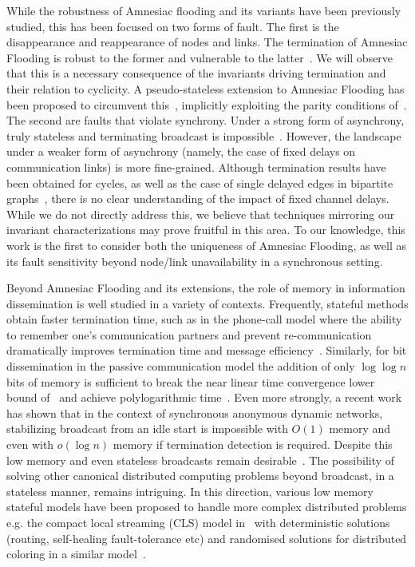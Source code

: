 While the robustness of Amnesiac flooding and its variants have been previously studied, this has been focused on two forms of fault. The first is the disappearance and reappearance of nodes and links. The termination of Amnesiac Flooding is robust to the former and vulnerable to the latter~\cite{hussak2023termination}. We will observe that  this is a necessary consequence of the invariants driving termination and their relation to cyclicity. A pseudo-stateless extension to Amnesiac Flooding has been proposed to circumvent this~\cite{turau2021synchronous}, implicitly exploiting the parity conditions of~\cite{hussak2023termination}. The second are faults that violate synchrony. Under a strong form of asynchrony, truly stateless and terminating broadcast is impossible~\cite{turau2020stateless}. However, the landscape under a weaker form of asynchrony (namely, the case of fixed delays on communication links) is more fine-grained. Although termination results have been obtained for cycles, as well as the case of single delayed edges in bipartite graphs~\cite{hussak2023termination}, there is no clear understanding of the impact of fixed channel delays. While we do not directly address this, we believe that techniques mirroring our invariant characterizations may prove fruitful in this area. To our knowledge, this work is the first to consider both the uniqueness of Amnesiac Flooding, as well as its fault sensitivity beyond node/link unavailability in a synchronous setting.

Beyond Amnesiac Flooding and its extensions, the role of memory in information dissemination is well studied in a variety of contexts. Frequently, stateful methods obtain faster termination time, such as in the phone-call model where the ability to remember one's communication partners and prevent re-communication dramatically improves termination time and message efficiency~\cite{RandomisedBroadcastFirst,RandomisedBroadcastFinal,SocialNetworksSpreadRumors}. 
Similarly, for bit dissemination in the passive communication model the addition of only $\log{\log{n}}$ bits of memory is sufficient to break the near linear time convergence lower bound of~\cite{LimitsofInformationSpread} and achieve polylogarithmic time~\cite{korman2022early}. 
Even more strongly, a recent work~\cite{MemoryLowerBoundsDISC} has shown that in the context of synchronous anonymous dynamic networks, stabilizing broadcast from an idle start is impossible with $O(1)$ memory and even with $o(\log{n})$ memory if termination detection is required.
Despite this low memory and even stateless broadcasts remain desirable~\cite{gopal1999fast}. 
The possibility of solving other canonical distributed computing problems beyond broadcast, in a stateless manner, remains intriguing. In this direction, various low memory stateful models have been proposed to handle more complex distributed problems e.g. the compact local streaming (CLS) model in~\cite{CastanedaLT20-CLS-ICDCN20} with deterministic solutions (routing, self-healing fault-tolerance etc) and randomised solutions for distributed coloring in a similar model~\cite{Flin0HKN23-LowMemColouring-SPAA23}. 

